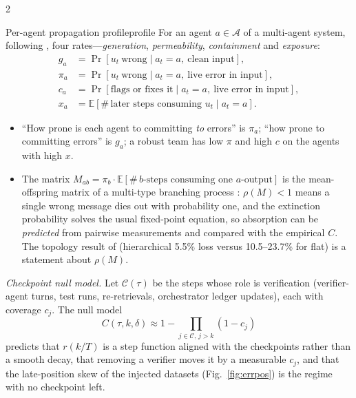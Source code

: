 \begin{multicols}{2}
\begin{definition}{Per-agent propagation profile}{profile}
For an agent $a\in\mathcal{A}$ of a multi-agent system, following \cite{hiller2004epic}, four rates---\emph{generation}, \emph{permeability}, \emph{containment} and \emph{exposure}:
\begin{align*}
g_a&=\Pr[u_t\ \text{wrong}\mid a_t{=}a,\ \text{clean input}],\\
\pi_a&=\Pr[u_t\ \text{wrong}\mid a_t{=}a,\ \text{live error in input}],\\
c_a&=\Pr[\text{flags or fixes it}\mid a_t{=}a,\ \text{live error in input}],\\
x_a&=\mathbb{E}[\#\,\text{later steps consuming }u_t\mid a_t{=}a].
\end{align*}
\begin{itemize}[leftmargin=1.1em]
\item ``How prone is each agent to committing \emph{to} errors'' is $\pi_a$; ``how prone to committing errors'' is $g_a$; a robust team has low $\pi$ and high $c$ on the agents with high $x$.
\item The matrix $M_{ab}=\pi_b\cdot\mathbb{E}[\#\,b\text{-steps consuming one }a\text{-output}]$ is the mean-offspring matrix of a multi-type branching process \cite{harris1963branching}: $\rho(M)<1$ means a single wrong message dies out with probability one, and the extinction probability solves the usual fixed-point equation, so absorption can be \emph{predicted} from pairwise measurements and compared with the empirical $C$. The topology result of \citet{huang2024resilience} (hierarchical 5.5\% loss versus 10.5--23.7\% for flat) is a statement about $\rho(M)$.
\end{itemize}
\end{definition}

\emph{Checkpoint null model.} Let $\mathcal{C}(\tau)$ be the steps whose role is verification (verifier-agent turns, test runs, re-retrievals, orchestrator ledger updates), each with coverage $c_j$. The null model
\[C(\tau,k,\delta)\approx1-\textstyle\prod_{j\in\mathcal{C},\,j>k}(1-c_j)\]
predicts that $r(k/T)$ is a step function aligned with the checkpoints rather than a smooth decay, that removing a verifier moves it by a measurable $c_j$, and that the late-position skew of the injected datasets (Fig.~\ref{fig:errpos}) is the regime with no checkpoint left.


\end{multicols}
